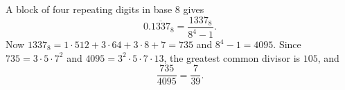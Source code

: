 A block of four repeating digits in base $8$ gives
\[0.\overline{1337}_8=\dfrac{1337_8}{8^4-1}.\]
Now $1337_8=1\cdot512+3\cdot64+3\cdot8+7=735$ and $8^4-1=4095$. Since $735=3\cdot5\cdot7^2$ and $4095=3^2\cdot5\cdot7\cdot13$, the greatest common divisor is $105$, and
\[\dfrac{735}{4095}=\boxed{\dfrac{7}{39}}.\]

